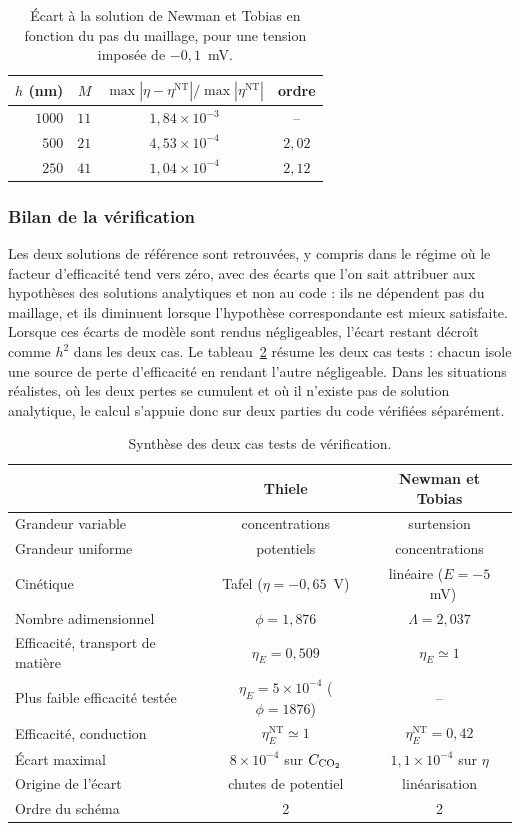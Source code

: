 \begin{table}[H]
\centering
\begin{tabular}{rrcc}
\hline
$h$ (nm) & $M$ & $\max|\eta - \eta^{\mathrm{NT}}|/\max|\eta^{\mathrm{NT}}|$ & ordre \\
\hline
$1000$ & $11$ & $1{,}84\times10^{-3}$ & -- \\
$500$  & $21$ & $4{,}53\times10^{-4}$ & $2{,}02$ \\
$250$  & $41$ & $1{,}04\times10^{-4}$ & $2{,}12$ \\
\hline
\end{tabular}
\caption{Écart à la solution de Newman et Tobias en fonction du pas du
maillage, pour une tension imposée de $-0{,}1$~mV.}
\label{tab:convergence_NT}
\end{table}

\subsubsection*{Bilan de la vérification}

Les deux solutions de référence sont retrouvées, y compris dans le régime
où le facteur d'efficacité tend vers zéro, avec des écarts que l'on
sait attribuer aux hypothèses des solutions analytiques et non au code : ils
ne dépendent pas du maillage, et ils diminuent lorsque l'hypothèse
correspondante est mieux satisfaite. Lorsque ces écarts de modèle sont
rendus négligeables, l'écart restant décroît comme $h^2$ dans les deux cas.
Le tableau~\ref{tab:bilan_verif} résume les deux cas tests : chacun isole une
source de perte d'efficacité en rendant l'autre négligeable. Dans les
situations réalistes, où les deux pertes se cumulent et où il n'existe pas de
solution analytique, le calcul s'appuie donc sur deux parties du code
vérifiées séparément.

\begin{table}[H]
\centering
\begin{tabular}{lcc}
\hline
 & Thiele & Newman et Tobias \\
\hline
Grandeur variable & concentrations & surtension \\
Grandeur uniforme & potentiels & concentrations \\
Cinétique & Tafel ($\eta = -0{,}65$~V) & linéaire ($E = -5$~mV) \\
Nombre adimensionnel & $\phi = 1{,}876$ & $\Lambda = 2{,}037$ \\
Efficacité, transport de matière & $\eta_E = 0{,}509$ & $\eta_E \simeq 1$ \\
Plus faible efficacité testée & $\eta_E = 5\times10^{-4}$ ($\phi = 1876$) & -- \\
Efficacité, conduction & $\eta_E^{\mathrm{NT}} \simeq 1$ & $\eta_E^{\mathrm{NT}} = 0{,}42$ \\
Écart maximal & $8\times10^{-4}$ sur $C_{\ce{CO2}}$ & $1{,}1\times10^{-4}$ sur $\eta$ \\
Origine de l'écart & chutes de potentiel & linéarisation \\
Ordre du schéma & 2 & 2 \\
\hline
\end{tabular}
\caption{Synthèse des deux cas tests de vérification.}
\label{tab:bilan_verif}
\end{table}

